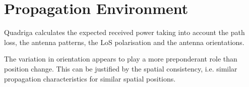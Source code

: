 \section{Propagation Environment}
\label{sec:propagation_environment}

Quadriga calculates the expected received power taking into account the path loss, the antenna patterns, the LoS polarisation and the antenna orientations.







The variation in orientation appears to play a more preponderant role than position change. This can be justified by the spatial consistency, i.e. similar propagation characteristics for similar spatial positions.


